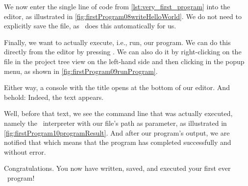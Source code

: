 We now enter the single line of code from \cref{lst:very_first_program} into the editor, as illustrated in \cref{fig:firstProgram08writeHelloWorld}.
We do not need to explicitly save the file, as \pycharm\ does this automatically for us.

Finally, we want to actually execute, i.e., run, our program.
We can do this directly from the editor by pressing .
We can also do it by right-clicking on the file in the project tree view on the left-hand side and then clicking  in the popup menu, as shown in \cref{fig:firstProgram09runProgram}.

Either way, a console with the title  opens at the bottom of our editor.
And behold:
Indeed, the text  appears.

Well, before that text, we see the command line that was actually executed, namely the \python\ interpreter with our file's path as parameter, as illustrated in \cref{fig:firstProgram10programResult}.
And after our program's output, we are notified that  which means that the program has completed successfully and without error.

Congratulations.
You now have written, saved, and executed your first ever \python\ program!%
\FloatBarrier%
\endhsection%
%
